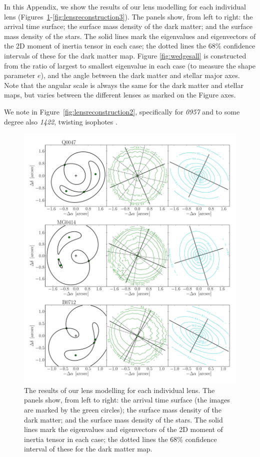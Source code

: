 \documentclass[useAMS,usenatbib]{mn2e}
\begin{document}
In this Appendix, we show the results of our lens modelling for each individual lens (Figures~\ref{fig:lensreconstruction1}-\ref{fig:lensreconstruction3}). The panels show, from left to right: the arrival time surface; the surface mass density of the dark matter; and the surface mass density of the stars. The solid lines mark the eigenvalues and eigenvectors of the 2D moment of inertia tensor in each case; the dotted lines the 68\% confidence intervals of these for the dark matter map. Figure \ref{fig:wedgesall} is constructed from the ratio of largest to smallest eigenvalue in each case (to measure the shape parameter $e$), and the angle between the dark matter and stellar major axes. Note that the angular scale is always the same for the dark matter and stellar maps, but varies between the different lenses as marked on the Figure axes.

We note in Figure~\ref{fig:lensreconstruction2}, specifically for {\it0957} and to some degree also {\it1422}, twisting isophotes \citep[e.g.][]{1978ComAp...8...27B}.

\begin{figure}
  \centering
  \includegraphics[width=.8\linewidth]{Figures/AllLenses31.pdf}
  \caption[width=.65\linewidth]{The results of our lens modelling for each individual lens. The panels show, from left to right: the arrival time surface (the images are marked by the green circles); the surface mass density of the dark matter; and the surface mass density of the stars. The solid lines mark the eigenvalues and eigenvectors of the 2D moment of inertia tensor in each case; the dotted lines the 68\% confidence interval of these for the dark matter map.}
  \label{fig:lensreconstruction1}
\end{figure}
\end{document}
